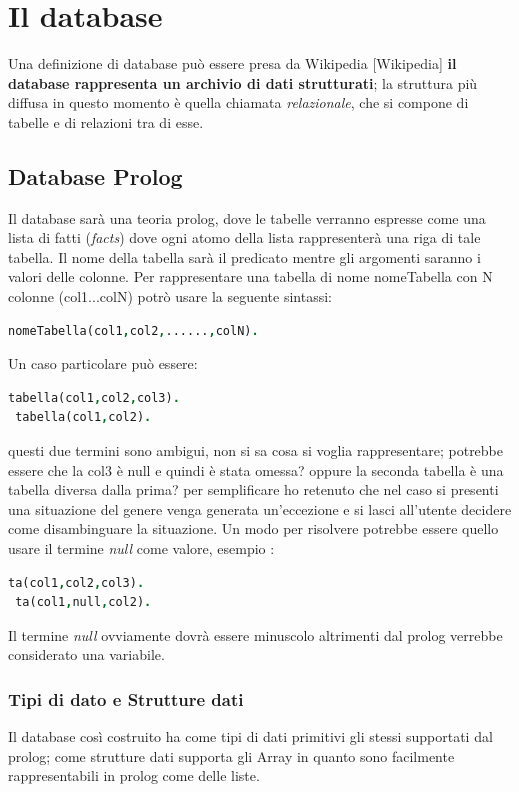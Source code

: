 \section{Il database}

Una definizione di database può essere presa da Wikipedia [Wikipedia] {\bf il database rappresenta un archivio di dati strutturati}; la struttura più diffusa in questo momento è quella chiamata \emph{relazionale}, che si compone di tabelle e di relazioni tra di esse.

\subsection{Database Prolog}
Il database sarà una teoria prolog, dove le tabelle verranno espresse come una lista di fatti (\emph{facts}) dove ogni atomo della lista rappresenterà una riga di tale tabella. Il nome della tabella sarà il predicato mentre gli argomenti saranno i valori delle colonne. Per rappresentare una tabella di nome nomeTabella con N colonne (col1...colN) potrò usare la seguente sintassi:
\begin{lstlisting}[language=Prolog]
 nomeTabella(col1,col2,......,colN).
\end{lstlisting}
Un caso particolare può essere: 
\begin{lstlisting}[language=Prolog]
 tabella(col1,col2,col3).
 tabella(col1,col2).
\end{lstlisting}
questi due termini sono ambigui, non si sa cosa si voglia rappresentare; potrebbe essere che la col3 è null e quindi è stata omessa? oppure la seconda tabella è una tabella diversa dalla prima? per semplificare ho retenuto che nel caso si presenti una situazione del genere venga generata un'eccezione e si lasci all'utente decidere come disambinguare la situazione. Un modo per risolvere potrebbe essere quello usare il termine \emph{null} come valore, esempio : 

\begin{lstlisting}[language=Prolog]
 ta(col1,col2,col3).
 ta(col1,null,col2).
\end{lstlisting} 

Il termine \emph{null} ovviamente dovrà essere minuscolo altrimenti dal prolog verrebbe considerato una variabile. 

\subsubsection{Tipi di dato e Strutture dati}
Il database così costruito ha come tipi di dati primitivi gli stessi supportati dal prolog; come strutture dati supporta gli Array in quanto sono facilmente rappresentabili in prolog come delle liste. 

